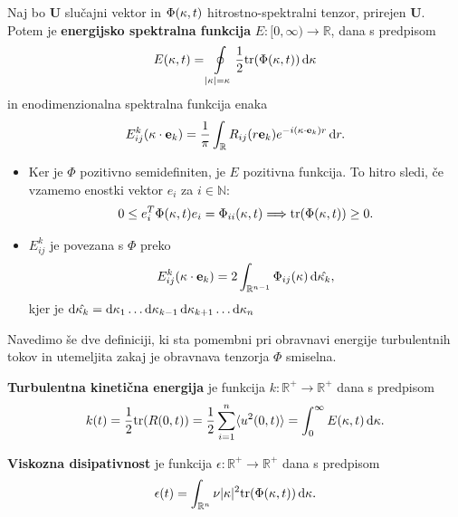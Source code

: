 \documentclass[mat2, tisk]{fmfdelo}
\newcommand{\R}{\mathbb R}
\newcommand{\N}{\mathbb N}
\newcommand{\bd}{\textbf}
\begin{document}
\begin{definicija}
Naj bo $\bd{U}$ slučajni vektor in $\Phi(\text{\bd{$\kappa$}}, t)$ 
hitrostno-spektralni tenzor, prirejen $\bd{U}$. Potem je \bd{energijsko spektralna funkcija} $E: [0, \infty) \rightarrow \R$, dana
s predpisom
\begin{equation}
E(\kappa, t) = \oint\limits_{|\text{\bd{$\kappa$}}| = \kappa} \frac{1}{2} \text{tr}(\Phi(\text{\bd{$\kappa$}}, t)) \dif \text{\bd{$\kappa$}}
\end{equation}
in enodimenzionalna spektralna funkcija enaka 
\begin{equation}
E_{ij}^k (\bd{\text{$\kappa$}} \cdot \bd{e}_k) = \frac{1}{\pi} \int_\R R_{ij}(r\bd{e}_k) e^{-i(\bd{\text{$\kappa$}} \cdot \bd{e}_k)r} \dif r.
\end{equation}
\end{definicija}

\begin{opomba}
  \hfill
\begin{itemize}
\item Ker je $\Phi$ pozitivno semidefiniten, je $E$ pozitivna funkcija. To hitro sledi, če vzamemo 
enostki vektor $e_i$ za $i\in \N$:
$$
0 \leq e^T_i \Phi(\text{\bd{$\kappa$}}, t) e_i = \Phi_{ii}(\text{\bd{$\kappa$}}, t) \Longrightarrow \text{tr}(\Phi(\text{\bd{$\kappa$}}, t)) \geq 0.
$$
\item $E_{ij}^k$ je povezana s $\Phi$ preko 
$$
E^k_{ij}(\bd{\text{$\kappa$}} \cdot \bd{e}_k) = 2 \int_{\R^{n-1}} \Phi_{ij}(\bd{\text{$\kappa$}}) \dif \hat{\bd{\text{$\kappa$}}_k},
$$
kjer je $ \dif \hat{\bd{\text{$\kappa$}}_k} = \dif \kappa_1 \dots \dif \kappa_{k-1} \dif \kappa_{k+1} \dots \dif \kappa_{n}$
\end{itemize}
\end{opomba}

Navedimo še dve definiciji, ki sta pomembni pri obravnavi energije 
turbulentnih tokov in utemeljita zakaj je obravnava tenzorja $\Phi$ smiselna.

\begin{definicija}
\textbf{Turbulentna kinetična energija} je funkcija $k:\R^+ \rightarrow \R^+$ dana s predpisom
\begin{equation}
k(t) = \frac{1}{2} \text{tr}(R(0, t)) = \frac{1}{2} \sum_{i=1}^{n} \langle u^2(0, t) \rangle = \int_{0}^\infty E(\kappa, t) \dif \kappa.
\end{equation}
\end{definicija}

\begin{definicija}
\bd{Viskozna disipativnost} je funkcija $\epsilon: \R^+ \rightarrow \R^+$ dana s predpisom
\begin{equation}
\epsilon(t) = \int_{\R^n} \nu |\bd{\text{$\kappa$}}|^2 \text{tr}(\Phi(\bd{\text{$\kappa$}}, t)) \dif \bd{\text{$\kappa$}}.
\end{equation}
\end{definicija}
\end{document}
